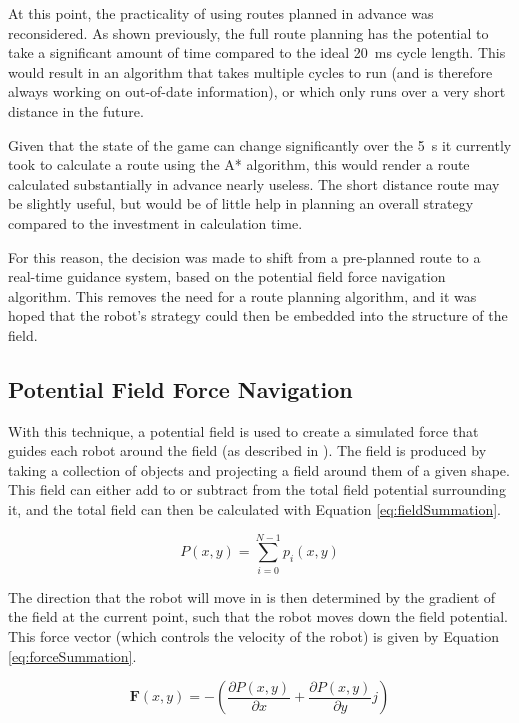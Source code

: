 \documentclass[10pt]{article}
\begin{document}
At this point, the practicality of using routes planned in advance was
reconsidered.  As shown previously, the full route planning has the potential to
take a significant amount of time compared to the ideal \SI{20}{\milli\second}
cycle length.  This would result in an algorithm that takes multiple cycles to
run (and is therefore always working on out-of-date information), or which only
runs over a very short distance in the future.

Given that the state of the game can change significantly over the
\SI{5}{\second} it currently took to calculate a route using the A* algorithm,
this would render a route calculated substantially in advance nearly useless. 
The short distance route may be slightly useful, but would be of little help in
planning an overall strategy compared to the investment in calculation time.

For this reason, the decision was made to shift from a pre-planned route to a
real-time guidance system, based on the potential field force navigation
algorithm. This removes the need for a route planning algorithm, and it was
hoped that the robot's strategy could then be embedded into the structure of the
field.

\subsection{Potential Field Force Navigation\label{sub:Potential-Field-Force}}

With this technique, a potential field is used to create a simulated force that
guides each robot around the field (as described in
\cite{intelligentAlgorithmPathPlanning}). The field is produced by taking a
collection of objects and projecting a field around them of a given shape. This
field can either add to or subtract from the total field potential surrounding
it, and the total field can then be calculated with Equation
\ref{eq:fieldSummation}.

\begin{equation}
P(x,y)=\sum_{i=0}^{N-1}p_{i}\left(x,y\right)\label{eq:fieldSummation}
\end{equation}

The direction that the robot will move in is then determined by the gradient of
the field at the current point, such that the robot moves down the field
potential. This force vector (which controls the velocity of the robot) is given
by Equation \ref{eq:forceSummation}.

\begin{equation}
\boldsymbol{F}(x,y)=-\left(\frac{{\partial P\left(x,y\right)}}{\partial x}+\frac{{\partial P\left(x,y\right)}}{\partial y}j\right)\label{eq:forceSummation}
\end{equation}
\end{document}
